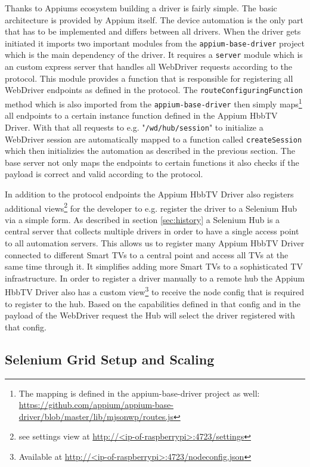 Thanks to Appiums ecosystem building a driver is fairly simple. The basic architecture is provided by Appium itself. The device automation is the only part that has to be implemented and differs between all drivers. When the driver gets initiated it imports two important modules from the \texttt{appium-base-driver} project which is the main dependency of the driver. It requires a \texttt{server} module which is an custom express server that handles all WebDriver requests according to the protocol. This module provides a function that is responsible for registering all WebDriver endpoints as defined in the protocol. The \texttt{routeConfiguringFunction} method which is also imported from the \texttt{appium-base-driver} then simply maps\footnote{The mapping is defined in the appium-base-driver project as well: \url{https://github.com/appium/appium-base-driver/blob/master/lib/mjsonwp/routes.js}} all endpoints to a certain instance function defined in the Appium HbbTV Driver. With that all requests to e.g. "\texttt{/wd/hub/session}" to initialize a WebDriver session are automatically mapped to a function called \texttt{createSession} which then initializies the automation as described in the previous section. The base server not only maps the endpoints to certain functions it also checks if the payload is correct and valid according to the protocol.

In addition to the protocol endpoints the Appium HbbTV Driver also registers additional views\footnote{see settings view at \url{http://<ip-of-raspberrypi>:4723/settings}} for the developer to e.g. register the driver to a Selenium Hub via a simple form. As described in section \ref{sec:history} a Selenium Hub is a central server that collects multiple drivers in order to have a single access point to all automation servers. This allows us to register many Appium HbbTV Driver connected to different Smart TVs to a central point and access all TVs at the same time through it. It simplifies adding more Smart TVs to a sophisticated TV infrastructure. In order to register a driver manually to a remote hub the Appium HbbTV Driver also has a custom view\footnote{Available at \url{http://<ip-of-raspberrypi>:4723/nodeconfig.json}} to receive the node config that is required to register to the hub. Based on the capabilities defined in that config and in the payload of the WebDriver request the Hub will select the driver registered with that config.

\subsection{Selenium Grid Setup and Scaling\label{sec:setupscaling}}

